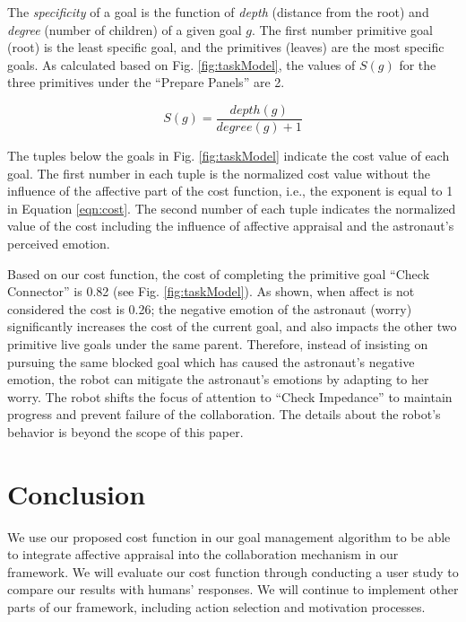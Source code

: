 \documentclass[conference]{IEEEtran}
\begin{document}
The \textit{specificity} of a goal is the function of \textit{depth} (distance
from the root) and \textit{degree} (number of children) of a given goal $g$. The
first number primitive goal (root) is the least specific goal, and the
primitives (leaves) are the most specific goals. As calculated based on Fig.
\ref{fig:taskModel}, the values of $S(g)$ for the three primitives under the
``Prepare Panels'' are 2.

\vspace*{-2mm}
\begin{equation}
S(g) = \frac{depth(g)}{degree(g)+1}
\label{eqn:specificity}
\end{equation}

\vspace*{-1mm}
The tuples below the goals in Fig. \ref{fig:taskModel} indicate the cost value
of each goal. The first number in each tuple is the normalized cost value
without the influence of the affective part of the cost function, i.e., the
exponent is equal to 1 in Equation \ref{eqn:cost}. The second number of each
tuple indicates the normalized value of the cost including the influence of
affective appraisal and the astronaut's perceived emotion.

Based on our cost function, the cost of completing the primitive goal ``Check
Connector'' is 0.82 (see Fig. \ref{fig:taskModel}). As shown, when affect is
not considered the cost is 0.26; the negative emotion of the astronaut (worry)
significantly increases the cost of the current goal, and also impacts the other
two primitive live goals under the same parent. Therefore, instead of insisting
on pursuing the same blocked goal which has caused the astronaut's negative
emotion, the robot can mitigate the astronaut's emotions by adapting to her
worry. The robot shifts the focus of attention to ``Check Impedance'' to
maintain progress and prevent failure of the collaboration. The details about
the robot's behavior is beyond the scope of this paper.

\vspace*{-3mm}
\section{Conclusion}
\vspace*{-1mm}
We use our proposed cost function in our goal management algorithm to be able to
integrate affective appraisal into the collaboration mechanism in our framework.
We will evaluate our cost function through conducting a user study to compare
our results with humans' responses. We will continue to implement other parts of
our framework, including action selection and motivation processes.
\vspace*{-1mm}



\end{document}
